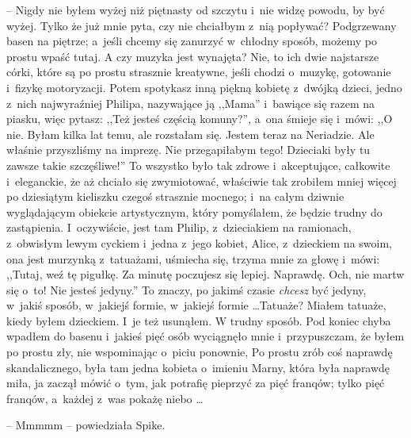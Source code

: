 \documentclass[oneside,polish,11pt,rmheadings]{mwbk}
\begin{document}
-- Nigdy nie byłem wyżej niż piętnasty od szczytu i~nie widzę powodu, by być wyżej. Tylko że już mnie pyta, czy nie chciałbym z~nią popływać? Podgrzewany basen na piętrze; a~jeśli chcemy się zanurzyć w~chłodny sposób, możemy po prostu wpaść tutaj. A czy muzyka jest wynajęta? Nie, to ich dwie najstarsze córki, które są po prostu strasznie kreatywne, jeśli chodzi o~muzykę, gotowanie i~fizykę motoryzacji. Potem spotykasz inną piękną kobietę z~dwójką dzieci, jedno z~nich najwyraźniej Philipa, nazywające ją ,,Mama'' i~bawiące się razem na piasku, więc pytasz: ,,Też jesteś częścią komuny?'', a~ona śmieje się i~mówi: ,,O nie. Byłam kilka lat temu, ale rozstałam się. Jestem teraz na Neriadzie. Ale właśnie przyszliśmy na imprezę. Nie przegapiłabym tego! Dzieciaki były tu zawsze takie szczęśliwe!'' To wszystko było tak zdrowe i~akceptujące, całkowite i~eleganckie, że aż chciało się zwymiotować, właściwie tak zrobiłem mniej więcej po dziesiątym kieliszku czegoś strasznie mocnego; i~na całym dziwnie wyglądającym obiekcie artystycznym, który pomyślałem, że będzie trudny do zastąpienia. I~oczywiście, jest tam Philip, z~dzieciakiem na ramionach, z~obwisłym lewym cyckiem i~jedna z~jego kobiet, Alice, z~dzieckiem na swoim, ona jest murzynką z~tatuażami, uśmiecha się, trzyma mnie za głowę i~mówi: ,,Tutaj, weź tę pigułkę. Za minutę poczujesz się lepiej. Naprawdę. Och, nie martw się o~to! Nie jesteś jedyny.'' To znaczy, po jakimś czasie \textit{chcesz }być jedyny, w~jakiś sposób, w~jakiejś formie, w~jakiejś formie \ldots   Tatuaże? Miałem tatuaże, kiedy byłem dzieckiem. I~je też usunąłem. W trudny sposób. Pod koniec chyba wpadłem do basenu i~jakieś pięć osób wyciągnęło mnie i~przypuszczam, że byłem po prostu zły, nie wspominając o~piciu ponownie, Po prostu zrób coś naprawdę skandalicznego, była tam jedna kobieta o~imieniu Marny, która była naprawdę miła, ja zaczął mówić o~tym, jak potrafię pieprzyć za pięć franqów; tylko pięć franqów, a~każdej z~was pokażę niebo \ldots  

-- Mmmmm -- powiedziała Spike. 
\end{document}
